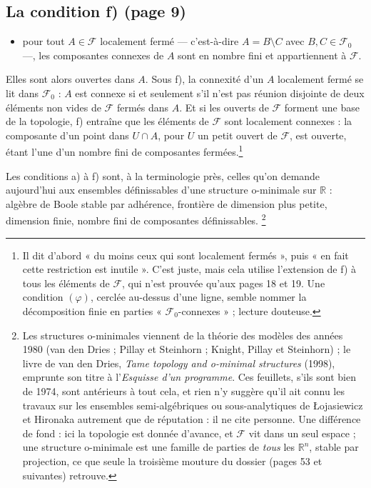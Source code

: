 \documentclass[11pt,a4paper]{article}
\begin{document}
\subsection*{La condition f) (page 9)}

\begin{itemize}
\item[f)] pour tout $A \in \mathcal{F}$ localement fermé — c'est-à-dire
  $A = B \setminus C$ avec $B, C \in \mathcal{F}_0$ —, les composantes
  connexes de $A$ sont en nombre fini et appartiennent à $\mathcal{F}$.
\end{itemize}

Elles sont alors ouvertes dans $A$. Sous f), la connexité d'un $A$
localement fermé se lit dans $\mathcal{F}_0$ : $A$ est connexe si et seulement
s'il n'est pas réunion disjointe de deux éléments non vides de $\mathcal{F}$
fermés dans $A$. Et si les ouverts de $\mathcal{F}$ forment une base de la
topologie, f) entraîne que les éléments de $\mathcal{F}$ sont localement
connexes : la composante d'un point dans $U \cap A$, pour $U$ un petit ouvert
de $\mathcal{F}$, est ouverte, étant l'une d'un nombre fini de composantes
fermées.\footnote{Il dit d'abord « du moins ceux qui sont localement fermés »,
puis « en fait cette restriction est inutile ». C'est juste, mais cela utilise
l'extension de f) à tous les éléments de $\mathcal{F}$, qui n'est prouvée
qu'aux pages 18 et 19. Une condition $(\varphi)$, cerclée au-dessus d'une
ligne, semble nommer la décomposition finie en parties
« $\mathcal{F}_0$-connexes » ; lecture douteuse.}

Les conditions a) à f) sont, à la terminologie près, celles qu'on demande
aujourd'hui aux ensembles définissables d'une structure o-minimale sur
$\mathbb{R}$ : algèbre de Boole stable par adhérence, frontière de dimension
plus petite, dimension finie, nombre fini de composantes définissables.
\footnote{Les structures o-minimales viennent de la théorie des modèles des
années 1980 (van den Dries ; Pillay et Steinhorn ; Knight, Pillay et
Steinhorn) ; le livre de van den Dries, \emph{Tame topology and o-minimal
structures} (1998), emprunte son titre à l'\emph{Esquisse d'un programme}. Ces
feuillets, s'ils sont bien de 1974, sont antérieurs à tout cela, et rien n'y
suggère qu'il ait connu les travaux sur les ensembles semi-algébriques ou
sous-analytiques de Łojasiewicz et Hironaka autrement que de réputation : il ne
cite personne. Une différence de fond : ici la topologie est donnée d'avance,
et $\mathcal{F}$ vit dans un seul espace ; une structure o-minimale est une
famille de parties de \emph{tous} les $\mathbb{R}^n$, stable par projection,
ce que seule la troisième mouture du dossier (pages 53 et suivantes) retrouve.}
\end{document}
